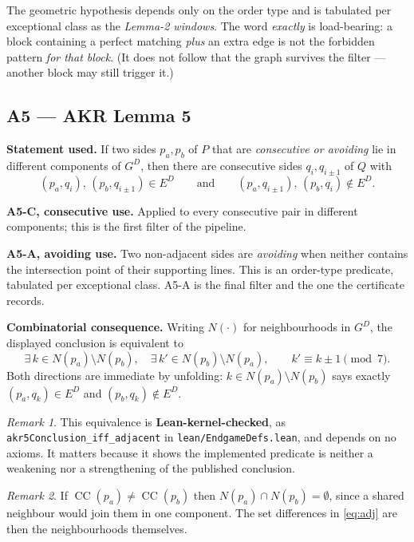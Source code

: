\documentclass[11pt,a4paper]{article}
\theoremstyle{plain}
\theoremstyle{definition}
\theoremstyle{remark}
\newtheorem*{remark}{Remark}
\newcommand{\GD}{G^{D}}
\newcommand{\ED}{E^{D}}
\newcommand{\CC}{\operatorname{CC}}
\begin{document}
The geometric hypothesis depends only on the order type and is tabulated per
exceptional class as the \emph{Lemma-2 windows}. The word \emph{exactly} is
load-bearing: a block containing a perfect matching \emph{plus} an extra edge is
not the forbidden pattern \emph{for that block}. (It does not follow that the
graph survives the filter --- another block may still trigger it.)

\subsection{\textsf{A5} --- AKR Lemma 5}

\textbf{Statement used.} If two sides $p_a,p_b$ of $P$ that are \emph{consecutive
or avoiding} lie in different components of $\GD$, then there are consecutive
sides $q_i,q_{i\pm1}$ of $Q$ with
\[
  (p_a,q_i),\,(p_b,q_{i\pm1})\in\ED
  \qquad\text{and}\qquad
  (p_a,q_{i\pm1}),\,(p_b,q_i)\notin\ED .
\]

\textbf{\textsf{A5-C}, consecutive use.} Applied to every consecutive pair in
different components; this is the first filter of the pipeline.

\textbf{\textsf{A5-A}, avoiding use.} Two non-adjacent sides are \emph{avoiding}
when neither contains the intersection point of their supporting lines. This is an
order-type predicate, tabulated per exceptional class. \textsf{A5-A} is the final
filter and the one the certificate records.

\textbf{Combinatorial consequence.} Writing $N(\cdot)$ for neighbourhoods in
$\GD$, the displayed conclusion is equivalent to
\begin{equation}\label{eq:adj}
  \exists\, k\in N(p_a)\setminus N(p_b),\quad
  \exists\, k'\in N(p_b)\setminus N(p_a),\qquad
  k' \equiv k\pm 1 \pmod 7 .
\end{equation}
Both directions are immediate by unfolding: $k\in N(p_a)\setminus N(p_b)$ says
exactly $(p_a,q_k)\in\ED$ and $(p_b,q_k)\notin\ED$.

\begin{remark}
This equivalence is \textbf{Lean-kernel-checked}, as
\texttt{akr5Conclusion\_iff\_adjacent} in \texttt{lean/EndgameDefs.lean}, and
depends on no axioms. It matters because it shows the implemented predicate is
neither a weakening nor a strengthening of the published conclusion.
\end{remark}

\begin{remark}
If $\CC(p_a)\neq\CC(p_b)$ then $N(p_a)\cap N(p_b)=\emptyset$, since a shared
neighbour would join them in one component. The set differences in
\eqref{eq:adj} are then the neighbourhoods themselves.
\end{remark}
\end{document}
